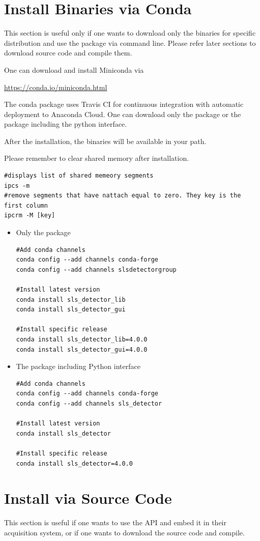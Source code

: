 \documentclass{article}
\begin{document}
\section{Install Binaries via Conda}
This section is useful only if one wants to download only the binaries for
specific distribution and use the package via command line. Please refer later
sections to download source code and compile them.


One can download and install Miniconda via 

\url{https://conda.io/miniconda.html}


The conda package uses Travis CI for continuous integration with
automatic deployment to Anaconda Cloud. One can download only the package or the
package including the python interface.


After the installation, the binaries will be available in your path.

Please remember to clear shared memory after installation.
\begin{verbatim}
#displays list of shared memeory segments 
ipcs -m
#remove segments that have nattach equal to zero. They key is the first column
ipcrm -M [key]
\end{verbatim}

\begin{itemize}
 \item Only the package
\begin{verbatim}
#Add conda channels
conda config --add channels conda-forge
conda config --add channels slsdetectorgroup

#Install latest version
conda install sls_detector_lib
conda install sls_detector_gui

#Install specific release
conda install sls_detector_lib=4.0.0
conda install sls_detector_gui=4.0.0

\end{verbatim}
 \item The package including Python interface
\begin{verbatim}
#Add conda channels
conda config --add channels conda-forge
conda config --add channels sls_detector

#Install latest version
conda install sls_detector

#Install specific release 
conda install sls_detector=4.0.0

\end{verbatim}
\end{itemize}


\clearpage
\section{Install via Source Code}
This section is useful if one wants to use the API and embed it in their
acquisition system, or if one wants to download the source code and compile.
\end{document}
